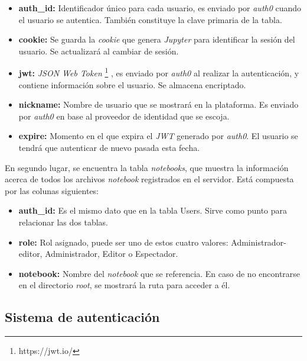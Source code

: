 \documentclass[11pt,spanish,listoffigures]{tfgetsinf}
\begin{document}
\begin{itemize}

\item \textbf{auth\_id:} Identificador único para cada usuario, es enviado por \textit{auth0} cuando el usuario se autentica. También constituye la clave primaria de la tabla.

\item \textbf{cookie:} Se guarda la \textit{cookie} que genera \textit{Jupyter} para identificar la sesión del usuario. Se actualizará al cambiar de sesión.

\item \textbf{jwt:} \textit{JSON Web Token} \footnote{https://jwt.io/} , es enviado por \textit{auth0} al realizar la autenticación, y contiene información sobre el usuario. Se almacena encriptado.

\item \textbf{nickname:} Nombre de usuario que se mostrará en la plataforma. Es enviado por \textit{auth0} en base al proveedor de identidad que se escoja.

\item \textbf{expire:} Momento en el que expira el \textit{\gls{JWT}} generado por \textit{auth0}. El usuario se tendrá que autenticar de nuevo pasada esta fecha.

\end{itemize}

En segundo lugar, se encuentra la tabla \textit{notebooks}, que muestra la información acerca de todos los archivos \textit{notebook} registrados en el servidor. Está compuesta por las colunas siguientes:

\begin{itemize}

\item \textbf{auth\_id:} Es el mismo dato que en la tabla Users. Sirve como punto para relacionar las dos tablas. 

\item \textbf{role:} Rol asignado, puede ser uno de estos cuatro valores: Administrador-editor, Administrador, Editor o Espectador.

\item \textbf{notebook:} Nombre del \textit{notebook} que se referencia. En caso de no encontrarse en el directorio \textit{root}, se mostrará la ruta para acceder a él.

\end{itemize}


\subsection{Sistema de autenticación}
\label{subsec:diseno-auth}
\end{document}

